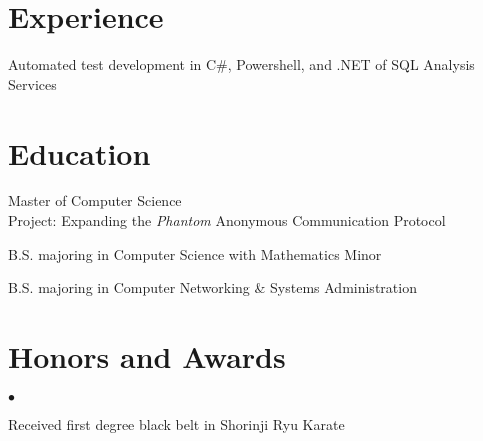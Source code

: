 \documentclass{resume}
\begin{document}
\maketitle
\thispagestyle{empty}

\section{Experience}
\begin{position}
	\item Automated test development in C\#, Powershell, and .NET of SQL Analysis Services
\end{position}

\section{Education}
\begin{school}
 \item Master of Computer Science\\
 {Project:} {\sffamily Expanding the \emph{Phantom} Anonymous Communication Protocol}\\
\end{school}

\begin{school}
     \item B.S. majoring in Computer Science with Mathematics Minor
     \item B.S. majoring in Computer Networking \& Systems Administration
\end{school}


\section{Honors and Awards}
    \begin{list}{$\bullet$}{\topsep \itemsep}
      \item Received first degree black belt in Shorinji Ryu Karate
    \end{list}
\end{document}
